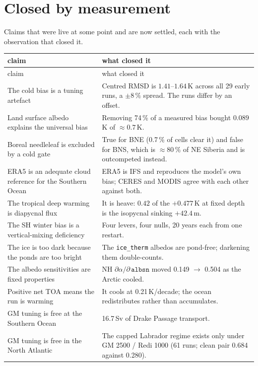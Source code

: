 \documentclass[10pt]{article}
\begin{document}
\section{Closed by measurement}\label{sec:closed}

Claims that were live at some point and are now settled, each with the observation that
closed it.

{\small
\begin{longtable}{p{6.6cm}p{9.4cm}}
\toprule
claim & what closed it \\
\midrule
\endfirsthead
\toprule
claim & what closed it \\
\midrule
\endhead
The cold bias is a tuning artefact &
Centred RMSD is $1.41$--$1.64$\,K across all 29 early runs, a $\pm8\,\%$ spread. The runs
differ by an offset. \\
Land surface albedo explains the universal bias &
Removing 74\,\% of a measured bias bought $0.089$\,K of ${\approx}0.7$\,K. \\
Boreal needleleaf is excluded by a cold gate &
True for BNE (0.7\,\% of cells clear it) and false for BNS, which is ${\approx}80\,\%$ of
NE Siberia and is outcompeted instead. \\
ERA5 is an adequate cloud reference for the Southern Ocean &
ERA5 is IFS and reproduces the model's own bias; CERES and MODIS agree with each other
against both. \\
The tropical deep warming is diapycnal flux &
It is heave: $0.42$ of the $+0.477$\,K at fixed depth is the isopycnal sinking $+42.4$\,m. \\
The SH winter bias is a vertical-mixing deficiency &
Four levers, four nulls, 20 years each from one restart. \\
The ice is too dark because the ponds are too bright &
The \texttt{ice\_therm} albedos are pond-free; darkening them double-counts. \\
The albedo sensitivities are fixed properties &
NH $\partial\alpha/\partial\,\texttt{albsn}$ moved 0.149 $\to$ 0.504 as the Arctic cooled. \\
Positive net TOA means the run is warming &
It cools at 0.21\,K/decade; the ocean redistributes rather than accumulates. \\
GM tuning is free at the Southern Ocean &
16.7\,Sv of Drake Passage transport. \\
GM tuning is free in the North Atlantic &
The capped Labrador regime exists only under GM 2500 / Redi 1000 (61 runs; clean pair 0.684
against 0.280). \\

\end{longtable}}
\end{document}
